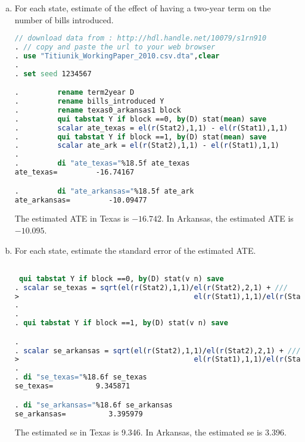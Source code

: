 \documentclass[11pt,notitlepage]{article}\usepackage[]{graphicx}\usepackage[]{color}
\begin{document}
\begin{enumerate}[a)]
\item For each state, estimate of the effect of having a two-year term on the number of bills introduced.

\begin{lstlisting}[language=stata]
 // download data from : http://hdl.handle.net/10079/s1rn910
. // copy and paste the url to your web browser
. use "Titiunik_WorkingPaper_2010.csv.dta",clear 
. 
. set seed 1234567

.         rename term2year D
.         rename bills_introduced Y
.         rename texas0_arkansas1 block         
.         qui tabstat Y if block ==0, by(D) stat(mean) save       
.         scalar ate_texas = el(r(Stat2),1,1) - el(r(Stat1),1,1)         
.         qui tabstat Y if block ==1, by(D) stat(mean) save       
.         scalar ate_ark = el(r(Stat2),1,1) - el(r(Stat1),1,1)
.         
.         di "ate_texas="%18.5f ate_texas 
ate_texas=         -16.74167

.         di "ate_arkansas="%18.5f ate_ark        
ate_arkansas=         -10.09477

\end{lstlisting}


The estimated ATE in Texas is \ensuremath{-16.742}.  In Arkansas, the estimated ATE is \ensuremath{-10.095}.

\item For each state, estimate the standard error of the estimated ATE.

\begin{lstlisting}[language=stata]

 qui tabstat Y if block ==0, by(D) stat(v n) save        
. scalar se_texas = sqrt(el(r(Stat2),1,1)/el(r(Stat2),2,1) + /// 
>                                         el(r(Stat1),1,1)/el(r(Stat1),2,1))
.                                         
. 
. qui tabstat Y if block ==1, by(D) stat(v n) save        

. 
. scalar se_arkansas = sqrt(el(r(Stat2),1,1)/el(r(Stat2),2,1) + /// 
>                                         el(r(Stat1),1,1)/el(r(Stat1),2,1)) 
. 
. di "se_texas="%18.6f se_texas
se_texas=          9.345871

. di "se_arkansas="%18.6f se_arkansas
se_arkansas=          3.395979

\end{lstlisting}

The estimated se in Texas is 9.346.  In Arkansas, the estimated se is 3.396.


\end{enumerate}
\end{document}
